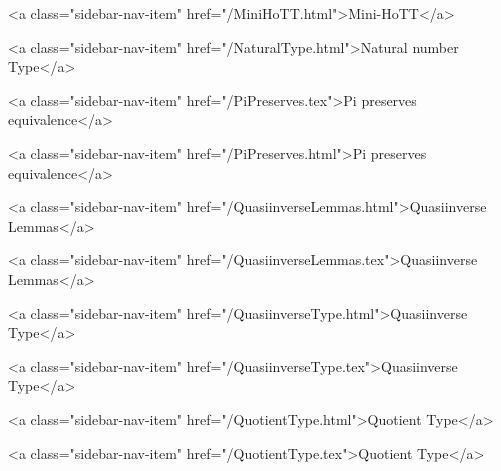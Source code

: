       
    
      
        
          <a class="sidebar-nav-item" href="/MiniHoTT.html">Mini-HoTT</a>
        
      
    
      
        
      
    
      
        
          <a class="sidebar-nav-item" href="/NaturalType.html">Natural number Type</a>
        
      
    
      
        
          <a class="sidebar-nav-item" href="/PiPreserves.tex">Pi preserves equivalence</a>
        
      
    
      
        
          <a class="sidebar-nav-item" href="/PiPreserves.html">Pi preserves equivalence</a>
        
      
    
      
        
          <a class="sidebar-nav-item" href="/QuasiinverseLemmas.html">Quasiinverse Lemmas</a>
        
      
    
      
        
          <a class="sidebar-nav-item" href="/QuasiinverseLemmas.tex">Quasiinverse Lemmas</a>
        
      
    
      
        
          <a class="sidebar-nav-item" href="/QuasiinverseType.html">Quasiinverse Type</a>
        
      
    
      
        
          <a class="sidebar-nav-item" href="/QuasiinverseType.tex">Quasiinverse Type</a>
        
      
    
      
        
          <a class="sidebar-nav-item" href="/QuotientType.html">Quotient Type</a>
        
      
    
      
        
          <a class="sidebar-nav-item" href="/QuotientType.tex">Quotient Type</a>
        
      
    
